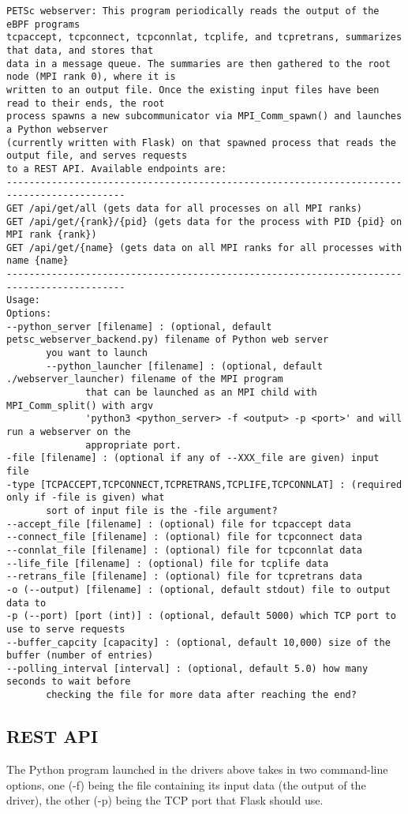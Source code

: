 \documentclass[11pt]{article}
\begin{document}
\begin{Verbatim}[xleftmargin=-3cm]
PETSc webserver: This program periodically reads the output of the eBPF programs
tcpaccept, tcpconnect, tcpconnlat, tcplife, and tcpretrans, summarizes that data, and stores that
data in a message queue. The summaries are then gathered to the root node (MPI rank 0), where it is
written to an output file. Once the existing input files have been read to their ends, the root
process spawns a new subcommunicator via MPI_Comm_spawn() and launches a Python webserver
(currently written with Flask) on that spawned process that reads the output file, and serves requests
to a REST API. Available endpoints are:
-------------------------------------------------------------------------------------------
GET /api/get/all (gets data for all processes on all MPI ranks)
GET /api/get/{rank}/{pid} (gets data for the process with PID {pid} on MPI rank {rank})
GET /api/get/{name} (gets data on all MPI ranks for all processes with name {name}
-------------------------------------------------------------------------------------------
Usage:
Options:
--python_server [filename] : (optional, default petsc_webserver_backend.py) filename of Python web server
       you want to launch
       --python_launcher [filename] : (optional, default ./webserver_launcher) filename of the MPI program
              that can be launched as an MPI child with MPI_Comm_split() with argv
              'python3 <python_server> -f <output> -p <port>' and will run a webserver on the
              appropriate port.
-file [filename] : (optional if any of --XXX_file are given) input file
-type [TCPACCEPT,TCPCONNECT,TCPRETRANS,TCPLIFE,TCPCONNLAT] : (required only if -file is given) what
       sort of input file is the -file argument?
--accept_file [filename] : (optional) file for tcpaccept data
--connect_file [filename] : (optional) file for tcpconnect data
--connlat_file [filename] : (optional) file for tcpconnlat data
--life_file [filename] : (optional) file for tcplife data
--retrans_file [filename] : (optional) file for tcpretrans data
-o (--output) [filename] : (optional, default stdout) file to output data to
-p (--port) [port (int)] : (optional, default 5000) which TCP port to use to serve requests
--buffer_capcity [capacity] : (optional, default 10,000) size of the buffer (number of entries)
--polling_interval [interval] : (optional, default 5.0) how many seconds to wait before
       checking the file for more data after reaching the end?
\end{Verbatim}
\subsection*{REST API}
The Python program launched in the drivers above takes in two command-line options, one (-f) being the file containing its input data (the output of the driver), the other (-p) being the TCP port that Flask should use.
\end{document}
